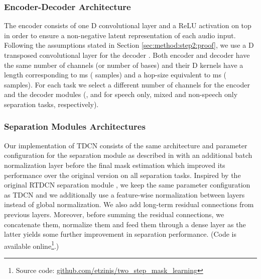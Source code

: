 \documentclass{article}
\begin{document}
\subsubsection{Encoder-Decoder Architecture}
The encoder  consists of one D convolutional layer and a ReLU activation on top in order to ensure a non-negative latent representation of each audio input. Following the assumptions stated in Section \ref{sec:method:step2:proof}, we use a D transposed convolutional layer for the decoder . Both encoder and decoder have the same number of channels (or number of bases) and their D kernels have a length corresponding to ms ( samples) and a hop-size equivalent to ms ( samples). For each task we select a different number of channels for the encoder and the decoder modules (,  and  for speech only, mixed and non-speech only separation tasks, respectively). 
\subsubsection{Separation Modules Architectures}
Our implementation of TDCN consists of the same architecture and parameter configuration for the separation module as described in \cite{luo2019convTasNet} with an additional batch normalization layer before the final mask estimation which improved its performance over the original version on all separation tasks. Inspired by the original RTDCN separation module \cite{kavalerov2019universal}, we keep the same parameter configuration as TDCN and we additionally use a feature-wise normalization between layers instead of global normalization. We also add long-term residual connections from previous layers. Moreover, before summing the residual connections, we concatenate them, normalize them and feed them through a dense layer as the latter yields some further improvement in separation performance. (Code is available online\footnote{Source code: \href{https://github.com/etzinis/two_step_mask_learning}{github.com/etzinis/two\_step\_mask\_learning}}.)
\end{document}
